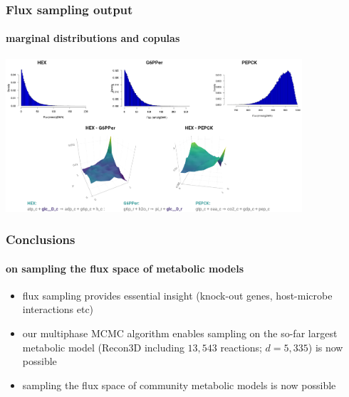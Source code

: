 \documentclass{beamer}
\begin{document}
   \begin{frame}
      \frametitle{Flux sampling output}
      \framesubtitle{marginal distributions and copulas}
      \includegraphics[width=110mm]{resources/copulas_cropped_transp.png}

   \end{frame}

   \begin{frame}
      \frametitle{Conclusions}
      \framesubtitle{on sampling the flux space of metabolic models}
      
      \begin{itemize}
         \item flux sampling provides essential insight (knock-out genes, host-microbe interactions etc)
         \item our multiphase MCMC algorithm enables sampling on the so-far largest metabolic model (Recon3D including $13,543$ reactions; $d=5,335$) is now possible
         \item sampling the flux space of community metabolic models is now possible
      \end{itemize}

   \end{frame}
\end{document}
